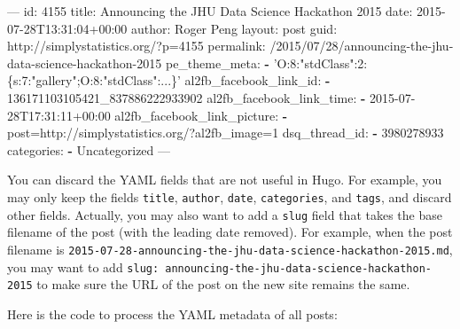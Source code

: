 \documentclass[12pt,]{krantz}
\makeatletter
\newenvironment{Shaded}{\begin{snugshade}}{\end{snugshade}}
\newcommand{\KeywordTok}[1]{\textcolor[rgb]{0.13,0.29,0.53}{\textbf{#1}}}
\newcommand{\StringTok}[1]{\textcolor[rgb]{0.31,0.60,0.02}{#1}}
\newcommand{\OtherTok}[1]{\textcolor[rgb]{0.56,0.35,0.01}{#1}}
\newcommand{\FunctionTok}[1]{\textcolor[rgb]{0.00,0.00,0.00}{#1}}
\newcommand{\AttributeTok}[1]{\textcolor[rgb]{0.77,0.63,0.00}{#1}}
\newcommand{\NormalTok}[1]{#1}
\newenvironment{kframe}{%
\medskip{}
\setlength{\fboxsep}{.8em}
 \def\at@end@of@kframe{}%
 \ifinner\ifhmode%
  \def\at@end@of@kframe{\end{minipage}}%
  \begin{minipage}{\columnwidth}%
 \fi\fi%
 \def\FrameCommand##1{\hskip\@totalleftmargin \hskip-\fboxsep
 \colorbox{shadecolor}{##1}\hskip-\fboxsep
     \hskip-\linewidth \hskip-\@totalleftmargin \hskip\columnwidth}%
 \MakeFramed {\advance\hsize-\width
   \@totalleftmargin\z@ \linewidth\hsize
   \@setminipage}}%
 {\par\unskip\endMakeFramed%
 \at@end@of@kframe}
\renewenvironment{Shaded}{\begin{kframe}}{\end{kframe}}
\theoremstyle{definition}
\theoremstyle{definition}
\theoremstyle{definition}
\theoremstyle{remark}
\makeatother
\begin{document}
\begin{Shaded}
\begin{Highlighting}[]
\OtherTok{---}
\FunctionTok{id:}\AttributeTok{ 4155}
\FunctionTok{title:}\AttributeTok{ Announcing the JHU Data Science Hackathon 2015}
\FunctionTok{date:}\AttributeTok{ 2015-07-28T13:31:04+00:00}
\FunctionTok{author:}\AttributeTok{ Roger Peng}
\FunctionTok{layout:}\AttributeTok{ post}
\FunctionTok{guid:}\AttributeTok{ http://simplystatistics.org/?p=4155}
\FunctionTok{permalink:}\AttributeTok{ /2015/07/28/announcing-the-jhu-data-science-hackathon-2015}
\FunctionTok{pe_theme_meta:}
  \KeywordTok{-} \StringTok{'O:8:"stdClass":2:\{s:7:"gallery";O:8:"stdClass":...\}'}
\FunctionTok{al2fb_facebook_link_id:}
  \KeywordTok{-}\NormalTok{ 136171103105421_837886222933902}
\FunctionTok{al2fb_facebook_link_time:}
  \KeywordTok{-} \FunctionTok{2015-07-28T17:}\AttributeTok{31:11+00:00}
\FunctionTok{al2fb_facebook_link_picture:}
  \KeywordTok{-} \FunctionTok{post=http:}\AttributeTok{//simplystatistics.org/?al2fb_image=1}
\FunctionTok{dsq_thread_id:}
  \KeywordTok{-}\NormalTok{ 3980278933}
\FunctionTok{categories:}
  \KeywordTok{-}\NormalTok{ Uncategorized}
\OtherTok{---}
\end{Highlighting}
\end{Shaded}

You can discard the YAML fields that are not useful in Hugo. For
example, you may only keep the fields \texttt{title}, \texttt{author},
\texttt{date}, \texttt{categories}, and \texttt{tags}, and discard other
fields. Actually, you may also want to add a \texttt{slug} field that
takes the base filename of the post (with the leading date removed). For
example, when the post filename is
\texttt{2015-07-28-announcing-the-jhu-data-science-hackathon-2015.md},
you may want to add
\texttt{slug:\ announcing-the-jhu-data-science-hackathon-2015} to make
sure the URL of the post on the new site remains the same.

Here is the code to process the YAML metadata of all posts:
\end{document}

